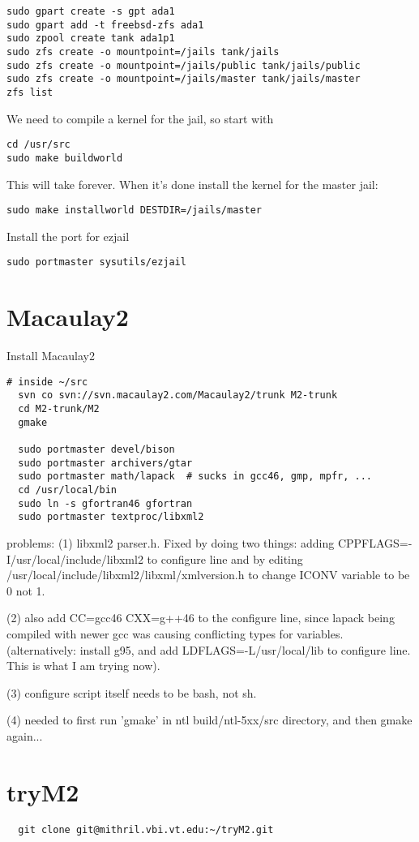 \documentclass[a4paper]{article}
\begin{document}
\begin{verbatim}
sudo gpart create -s gpt ada1
sudo gpart add -t freebsd-zfs ada1
sudo zpool create tank ada1p1
sudo zfs create -o mountpoint=/jails tank/jails
sudo zfs create -o mountpoint=/jails/public tank/jails/public
sudo zfs create -o mountpoint=/jails/master tank/jails/master
zfs list
\end{verbatim}


We need to compile a kernel for the jail, so start with

\begin{verbatim}
cd /usr/src
sudo make buildworld
\end{verbatim}

This will take forever.
When it's done install the kernel for the master jail:

\begin{verbatim}
sudo make installworld DESTDIR=/jails/master
\end{verbatim}

Install the port for ezjail

\begin{verbatim}
sudo portmaster sysutils/ezjail
\end{verbatim}

\section{Macaulay2}
Install Macaulay2

\begin{verbatim}
# inside ~/src
  svn co svn://svn.macaulay2.com/Macaulay2/trunk M2-trunk
  cd M2-trunk/M2
  gmake

  sudo portmaster devel/bison
  sudo portmaster archivers/gtar
  sudo portmaster math/lapack  # sucks in gcc46, gmp, mpfr, ...
  cd /usr/local/bin
  sudo ln -s gfortran46 gfortran
  sudo portmaster textproc/libxml2

\end{verbatim}

problems: (1) libxml2 parser.h.  Fixed by doing two things: adding
CPPFLAGS=-I/usr/local/include/libxml2 to configure line
and by editing /usr/local/include/libxml2/libxml/xmlversion.h to change ICONV
variable to be 0 not 1.

(2) also add CC=gcc46 CXX=g++46 to the configure line, since lapack being
compiled with newer gcc was causing conflicting types for variables.
(alternatively: install g95, and add LDFLAGS=-L/usr/local/lib to configure
line.  This is what I am trying now).

(3) configure script itself needs to be bash, not sh.

(4) needed to first run 'gmake' in ntl build/ntl-5xx/src directory, and then
gmake again...

\section{tryM2}
\begin{verbatim}
  git clone git@mithril.vbi.vt.edu:~/tryM2.git
\end{verbatim}
\end{document}
